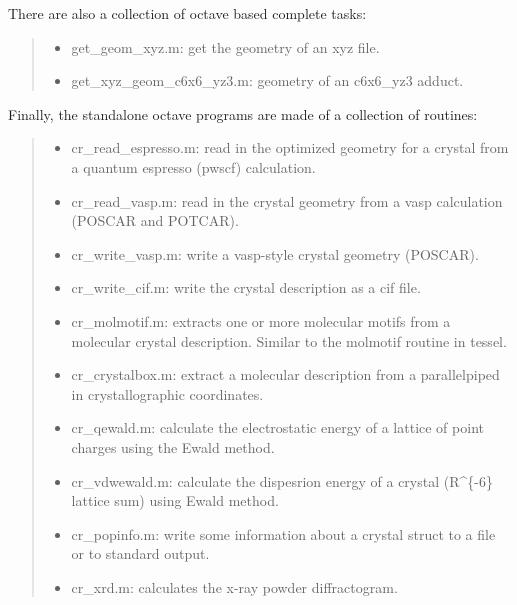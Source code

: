\documentclass[a4paper]{article}
\begin{document}
There are also a collection of octave based complete tasks:
%
\begin{quote}
%
\begin{itemize}

\item get\_geom\_xyz.m: get the geometry of an xyz file.

\item get\_xyz\_geom\_c6x6\_yz3.m: geometry of an c6x6\_yz3 adduct.

\end{itemize}

\end{quote}

Finally, the standalone octave programs are made of a collection of
routines:
%
\begin{quote}
%
\begin{itemize}

\item cr\_read\_espresso.m: read in the optimized geometry for a crystal from
a quantum espresso (pwscf) calculation.

\item cr\_read\_vasp.m: read in the crystal geometry from a vasp calculation
(POSCAR and POTCAR).

\item cr\_write\_vasp.m: write a vasp-style crystal geometry (POSCAR).

\item cr\_write\_cif.m: write the crystal description as a cif file.

\item cr\_molmotif.m: extracts one or more molecular motifs from a molecular
crystal description. Similar to the molmotif routine in tessel.

\item cr\_crystalbox.m: extract a molecular description from a
parallelpiped in crystallographic coordinates.

\item cr\_qewald.m: calculate the electrostatic energy of a lattice of
point charges using the Ewald method.

\item cr\_vdwewald.m: calculate the dispesrion energy of a crystal
(R\textasciicircum{}\{-6\} lattice sum) using Ewald method.

\item cr\_popinfo.m: write some information about a crystal struct to
a file or to standard output.

\item cr\_xrd.m: calculates the x-ray powder diffractogram.


\end{itemize}
\end{quote}
\end{document}
